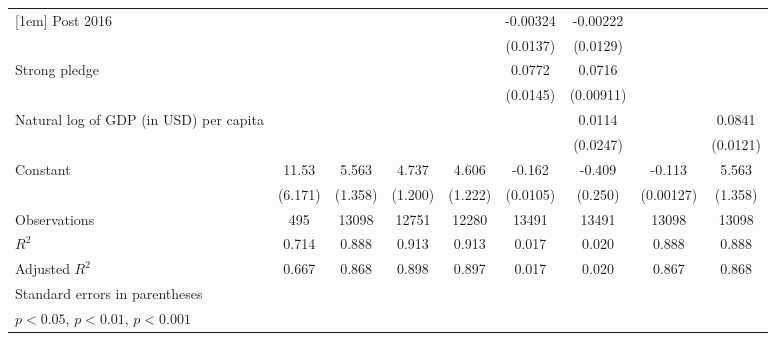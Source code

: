 {\begin{tabular}{l*{8}{c}}
[1em]
Post 2016           &                     &                     &                     &                     &    -0.00324         &    -0.00222         &                     &                     \\
                    &                     &                     &                     &                     &    (0.0137)         &    (0.0129)         &                     &                     \\
[1em]
Strong pledge       &                     &                     &                     &                     &      0.0772\sym{**} &      0.0716\sym{***}&                     &                     \\
                    &                     &                     &                     &                     &    (0.0145)         &   (0.00911)         &                     &                     \\
[1em]
Natural log of GDP (in USD) per capita&                     &                     &                     &                     &                     &      0.0114         &                     &      0.0841\sym{***}\\
                    &                     &                     &                     &                     &                     &    (0.0247)         &                     &    (0.0121)         \\
[1em]
Constant            &       11.53         &       5.563\sym{***}&       4.737\sym{***}&       4.606\sym{***}&      -0.162\sym{***}&      -0.409         &      -0.113\sym{***}&       5.563\sym{***}\\
                    &     (6.171)         &     (1.358)         &     (1.200)         &     (1.222)         &    (0.0105)         &     (0.250)         &   (0.00127)         &     (1.358)         \\
\hline
Observations        &         495         &       13098         &       12751         &       12280         &       13491         &       13491         &       13098         &       13098         \\
\(R^{2}\)           &       0.714         &       0.888         &       0.913         &       0.913         &       0.017         &       0.020         &       0.888         &       0.888         \\
Adjusted \(R^{2}\)  &       0.667         &       0.868         &       0.898         &       0.897         &       0.017         &       0.020         &       0.867         &       0.868         \\
\hline\hline
\multicolumn{9}{l}{\footnotesize Standard errors in parentheses}\\
\multicolumn{9}{l}{\footnotesize \sym{*} \(p<0.05\), \sym{**} \(p<0.01\), \sym{***} \(p<0.001\)}\\
\end{tabular}
}
